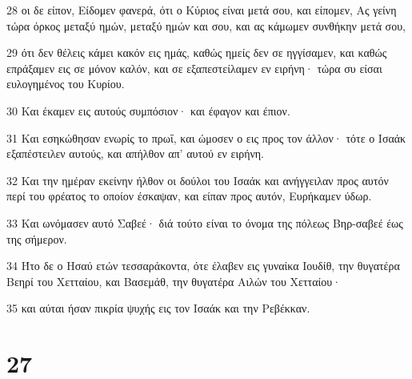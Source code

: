 \par 28 οι δε είπον, Είδομεν φανερά, ότι ο Κύριος είναι μετά σου, και είπομεν, Ας γείνη τώρα όρκος μεταξύ ημών, μεταξύ ημών και σου, και ας κάμωμεν συνθήκην μετά σου,
\par 29 ότι δεν θέλεις κάμει κακόν εις ημάς, καθώς ημείς δεν σε ηγγίσαμεν, και καθώς επράξαμεν εις σε μόνον καλόν, και σε εξαπεστείλαμεν εν ειρήνη· τώρα συ είσαι ευλογημένος του Κυρίου.
\par 30 Και έκαμεν εις αυτούς συμπόσιον· και έφαγον και έπιον.
\par 31 Και εσηκώθησαν ενωρίς το πρωΐ, και ώμοσεν ο εις προς τον άλλον· τότε ο Ισαάκ εξαπέστειλεν αυτούς, και απήλθον απ' αυτού εν ειρήνη.
\par 32 Και την ημέραν εκείνην ήλθον οι δούλοι του Ισαάκ και ανήγγειλαν προς αυτόν περί του φρέατος το οποίον έσκαψαν, και είπαν προς αυτόν, Ευρήκαμεν ύδωρ.
\par 33 Και ωνόμασεν αυτό Σαβεέ· διά τούτο είναι το όνομα της πόλεως Βηρ-σαβεέ έως της σήμερον.
\par 34 Ήτο δε ο Ησαύ ετών τεσσαράκοντα, ότε έλαβεν εις γυναίκα Ιουδίθ, την θυγατέρα Βεηρί του Χετταίου, και Βασεμάθ, την θυγατέρα Αιλών του Χετταίου·
\par 35 και αύται ήσαν πικρία ψυχής εις τον Ισαάκ και την Ρεβέκκαν.

\chapter{27}

